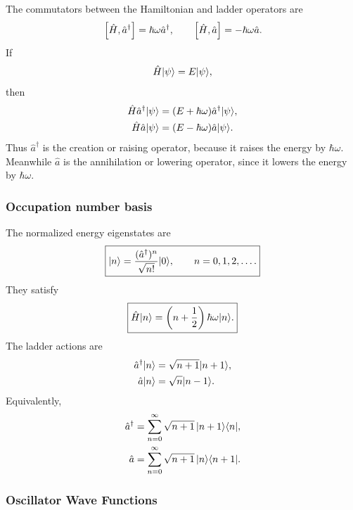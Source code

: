 The commutators between the Hamiltonian and ladder operators are
\begin{equation}
 \left[\hat H,\hat a^\dagger\right]=\hbar\omega\hat a^\dagger,
 \qquad
 \left[\hat H,\hat a\right]=-\hbar\omega\hat a.
\end{equation}
If
\begin{equation}
 \hat H|{\psi}\rangle=E|{\psi}\rangle,
\end{equation}
then
\begin{align}
 \hat H\hat a^\dagger|{\psi}\rangle
 &=(E+\hbar\omega)\hat a^\dagger|{\psi}\rangle,\\
 \hat H\hat a|{\psi}\rangle
 &=(E-\hbar\omega)\hat a|{\psi}\rangle.
\end{align}
Thus $\hat a^\dagger$ is the creation or raising operator, because it raises the energy by $\hbar\omega$. Meanwhile $\hat a$ is
the annihilation or lowering operator, since it lowers the energy by $\hbar\omega$. 

\subsubsection{Occupation number basis}
The normalized energy eigenstates are
\begin{equation}
 \boxed{
 |{n}\rangle=\frac{(\hat a^\dagger)^n}{\sqrt{n!}}|{0}\rangle,
 \qquad n=0,1,2,\ldots.}
\end{equation}
They satisfy
\begin{equation}
 \boxed{\hat H|{n}\rangle
 =\left(n+\frac12\right)\hbar\omega|{n}\rangle.}
\end{equation}
The ladder actions are
\begin{align}
 \hat a^\dagger|{n}\rangle&=\sqrt{n+1}|{n+1}\rangle,\\
 \hat a|{n}\rangle&=\sqrt n|{n-1}\rangle.
\end{align}
Equivalently,
\begin{align}
 \hat a^\dagger&=\sum_{n=0}^{\infty}
 \sqrt{n+1}\,|{n+1}\rangle\langle{n}|,\\
 \hat a&=\sum_{n=0}^{\infty}
 \sqrt{n+1}\,|{n}\rangle\langle{n+1}|.
\end{align}

\subsubsection{Oscillator Wave Functions}

